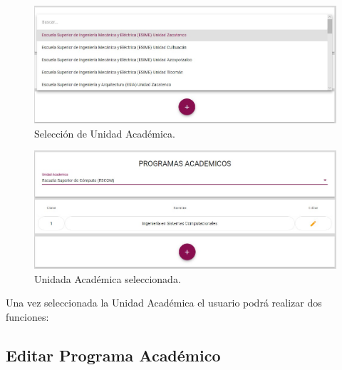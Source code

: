             \begin{figure}[H]
                \centering
                \hypertarget{prede}{\includegraphics[width=0.7\linewidth]{images/SP3/seleccion}}
                \caption{Selección de Unidad Académica.}
                \label{predes}
            \end{figure}

            \begin{figure}[H]
                \centering
                \hypertarget{predess}{\includegraphics[width=0.7\linewidth]{images/SP3/otraua}}
                \caption{Unidada Académica seleccionada.}
                \label{predess}
            \end{figure}

         Una vez seleccionada la Unidad Académica el usuario  podrá realizar dos funciones:


        \subsection{Editar Programa Académico}

